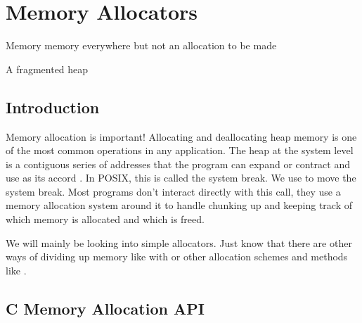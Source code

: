 \chapter{Memory Allocators}

\epigraph{Memory memory everywhere but not an allocation to be made}{A fragmented heap}

\section{Introduction}

Memory allocation is important!
Allocating and deallocating heap memory is one of the most common operations in any application.
The heap at the system level is a contiguous series of addresses that the program can expand or contract and use as its accord \cite{mallocinternals}.
In POSIX, this is called the system break.
We use  to move the system break.
Most programs don't interact directly with this call, they use a memory allocation system around it to handle chunking up and keeping track of which memory is allocated and which is freed.

We will mainly be looking into simple allocators.
Just know that there are other ways of dividing up memory like with  or other allocation schemes and methods like .

\section{C Memory Allocation API}

